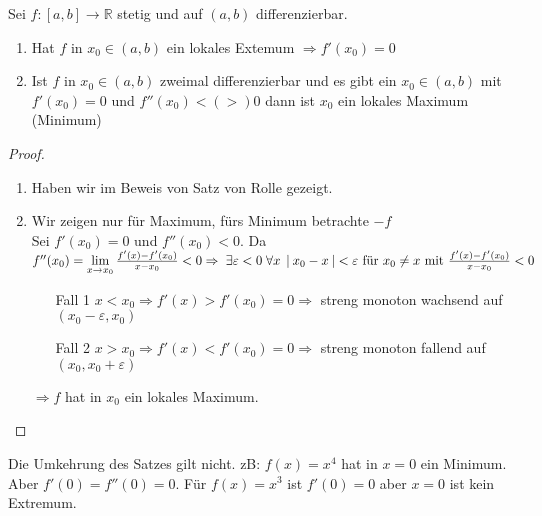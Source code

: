 \documentclass[a4paper,titlepage,oneside]{article}
\def\R{\ensuremath{\mathbb{R}} }
\renewcommand{\epsilon}{\ensuremath{\varepsilon} }
\def\sp{\hspace{0,1cm}}
\newcommand{\limAB}[3][x]{\ensuremath{\lim\limits_{#1 \rightarrow #2}{#3}}}
\newcommand{\limA}[2][x_0]{\limAB{#1}{#2}}
\newcommand{\abs}[1]{\ensuremath{\left|\:#1\:\right|}}
\theoremstyle{thmstyle}
\begin{document}
\begin{satz}
Sei $f : [a,b] \to \R $ stetig und auf $(a,b)$ differenzierbar.
\begin{enumerate}
\item Hat $f$ in $x_0 \in (a,b) $ ein lokales Extemum $ \Rightarrow f'(x_0) = 0$
\item Ist $f$ in $x_0 \in (a,b) $ zweimal differenzierbar und es gibt ein $x_0 \in (a,b)$ mit $f'(x_0) = 0$ und $f''(x_0) <(>) 0$ dann ist $x_0$ ein lokales Maximum (Minimum)
\end{enumerate}
\begin{proof}
\begin{enumerate}
\item Haben wir im Beweis von Satz von Rolle gezeigt.
\item Wir zeigen nur für Maximum, fürs Minimum betrachte $-f$\\
Sei $f'(x_0) = 0$ und $f''(x_0) < 0$. Da $f''(x_0) = \limA{\frac{f'(x) - f'(x_0)}{x - x_0}} < 0 \Rightarrow \sp \exists \epsilon < 0 \sp \forall x \sp \abs{x_0 - x} < \epsilon \text{ für } x_0 \ne x \text{ mit } \frac{f'(x) - f'(x_0)}{x - x_0} < 0$
\begin{enumerate}
\item[Fall 1] $x < x_0 \Rightarrow f'(x) > f'(x_0) = 0 \Rightarrow $ streng monoton wachsend auf $(x_0 - \epsilon, x_0)$
\item[Fall 2] $x > x_0 \Rightarrow f'(x) < f'(x_0) = 0  \Rightarrow $ streng monoton fallend auf $(x_0, x_0 + \epsilon)$
\end{enumerate}
$\Rightarrow f$ hat in $x_0$ ein lokales Maximum.
\end{enumerate}
\end{proof}
\end{satz}

\begin{bem}
Die Umkehrung des Satzes gilt nicht.
zB: $f(x) = x^4$ hat in $x = 0$ ein Minimum. Aber $f'(0) = f''(0) = 0$. Für $f(x) = x^3$ ist $f'(0) = 0$ aber $ x = 0$ ist kein Extremum.\\
\end{bem}
\end{document}
